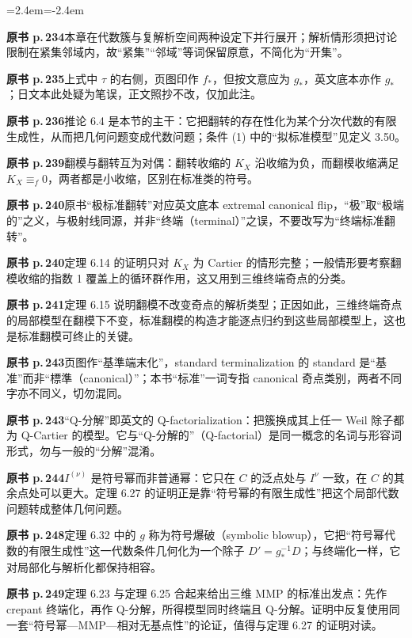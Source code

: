 \begin{list}{}{\leftmargin=2.4em\itemindent=-2.4em\itemsep=2pt\parsep=0pt}
\item \textbf{原书 p.\,234}\quad 本章在代数簇与复解析空间两种设定下并行展开；解析情形须把讨论限制在紧集邻域内，故“紧集”“邻域”等词保留原意，不简化为“开集”。
\item \textbf{原书 p.\,235}\quad 上式中 $\tau$ 的右侧，页图印作 $f_*$，但按文意应为 $g_*$，英文底本亦作 $g_*$；日文本此处疑为笔误，正文照抄不改，仅加此注。
\item \textbf{原书 p.\,236}\quad 推论 6.4 是本节的主干：它把翻转的存在性化为某个分次代数的有限生成性，从而把几何问题变成代数问题；条件 (1) 中的“拟标准模型”见定义 3.50。
\item \textbf{原书 p.\,239}\quad 翻模与翻转互为对偶：翻转收缩的 $K_X$ 沿收缩为负，而翻模收缩满足 $K_X\equiv_f 0$，两者都是小收缩，区别在标准类的符号。
\item \textbf{原书 p.\,240}\quad 原书“极标准翻转”对应英文底本 extremal canonical flip，“极”取“极端的”之义，与极射线同源，并非“终端（terminal）”之误，不要改写为“终端标准翻转”。
\item \textbf{原书 p.\,240}\quad 定理 6.14 的证明只对 $K_X$ 为 Cartier 的情形完整；一般情形要考察翻模收缩的指数 1 覆盖上的循环群作用，这又用到三维终端奇点的分类。
\item \textbf{原书 p.\,241}\quad 定理 6.15 说明翻模不改变奇点的解析类型；正因如此，三维终端奇点的局部模型在翻模下不变，标准翻模的构造才能逐点归约到这些局部模型上，这也是标准翻模可终止的关键。
\item \textbf{原书 p.\,243}\quad 页图作“基準端末化”，standard terminalization 的 standard 是“基准”而非“標準（canonical）”；本书“标准”一词专指 canonical 奇点类别，两者不同字亦不同义，切勿混同。
\item \textbf{原书 p.\,243}\quad “Q-分解”即英文的 Q-factorialization：把簇换成其上任一 Weil 除子都为 Q-Cartier 的模型。它与“Q-分解的”（Q-factorial）是同一概念的名词与形容词形式，勿与一般的“分解”混淆。
\item \textbf{原书 p.\,244}\quad $I^{(\nu)}$ 是符号幂而非普通幂：它只在 $C$ 的泛点处与 $I^{\nu}$ 一致，在 $C$ 的其余点处可以更大。定理 6.27 的证明正是靠“符号幂的有限生成性”把这个局部代数问题转成整体几何问题。
\item \textbf{原书 p.\,248}\quad 定理 6.32 中的 $g$ 称为符号爆破（symbolic blowup），它把“符号幂代数的有限生成性”这一代数条件几何化为一个除子 $D'=g_*^{-1}D$；与终端化一样，它对局部化与解析化都保持相容。
\item \textbf{原书 p.\,249}\quad 定理 6.23 与定理 6.25 合起来给出三维 MMP 的标准出发点：先作 crepant 终端化，再作 Q-分解，所得模型同时终端且 Q-分解。证明中反复使用同一套“符号幂—MMP—相对无基点性”的论证，值得与定理 6.27 的证明对读。

\end{list}
